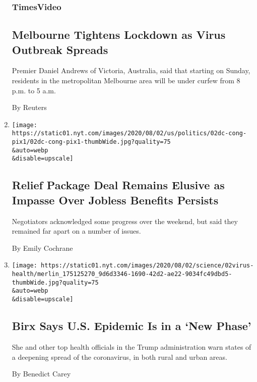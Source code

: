 \begin{enumerate}
  \hypertarget{timesvideo}{%
  \subsubsection{TimesVideo}\label{timesvideo}}

  \hypertarget{melbourne-tightens-lockdown-as-virus-outbreak-spreads}{%
  \subsection{Melbourne Tightens Lockdown as Virus Outbreak
  Spreads}\label{melbourne-tightens-lockdown-as-virus-outbreak-spreads}}

  Premier Daniel Andrews of Victoria, Australia, said that starting on
  Sunday, residents in the metropolitan Melbourne area will be under
  curfew from 8 p.m. to 5 a.m.

  By Reuters
\item
  \href{/2020/08/02/us/politics/coronavirus-jobless-aid.html}{}

  \texttt{[image: https://static01.nyt.com/images/2020/08/02/us/politics/02dc-cong-pix1/02dc-cong-pix1-thumbWide.jpg?quality=75\\\&auto=webp\\\&disable=upscale]}

  \hypertarget{relief-package-deal-remains-elusive-as-impasse-over-jobless-benefits-persists}{%
  \subsection{Relief Package Deal Remains Elusive as Impasse Over
  Jobless Benefits
  Persists}\label{relief-package-deal-remains-elusive-as-impasse-over-jobless-benefits-persists}}

  Negotiators acknowledged some progress over the weekend, but said they
  remained far apart on a number of issues.

  By Emily Cochrane
\item
  \href{/2020/08/02/health/dr-birx-coronavirus-phase.html}{}

  \texttt{[image: https://static01.nyt.com/images/2020/08/02/science/02virus-health/merlin\_175125270\_9d6d3346-1690-42d2-ae22-9034fc49dbd5-thumbWide.jpg?quality=75\\\&auto=webp\\\&disable=upscale]}

  \hypertarget{birx-says-us-epidemic-is-in-a-new-phase}{%
  \subsection{Birx Says U.S. Epidemic Is in a `New
  Phase'}\label{birx-says-us-epidemic-is-in-a-new-phase}}

  She and other top health officials in the Trump administration warn
  states of a deepening spread of the coronavirus, in both rural and
  urban areas.

  By Benedict Carey
\end{enumerate}

